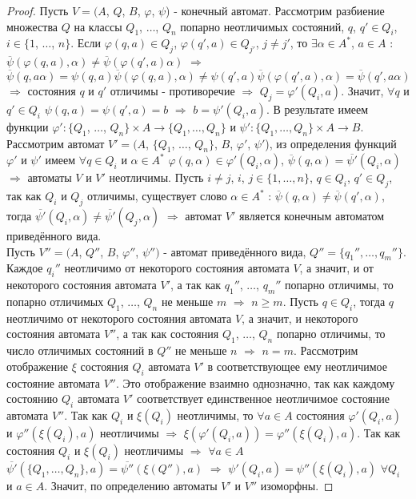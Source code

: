 \documentclass[a4paper, 12pt]{article}
\renewcommand{\phi}{\varphi}
\theoremstyle{definition}
\theoremstyle{plain}
\theoremstyle{remark}
\begin{document}
  \begin{proof}
    Пусть $V=(A$, $Q$, $B$, $\phi$, $\psi$) - конечный автомат. Рассмотрим разбиение множества $Q$ на классы $Q_1$, $\ldots$, $Q_n$ попарно неотличимых состояний, $q$, $q'\in Q_i$, $i\in\{1$, $\ldots$, $n\}$. Если $\phi(q,a)\in Q_j$, $\phi(q',a)\in Q_{j'}$, $j\neq j'$, то $\exists \alpha\in A^*$, $a\in A$ : $\overline{\psi}(\phi(q,a),\alpha)\neq\overline{\psi}(\phi(q',a)\alpha)$ $\Longrightarrow$ $\overline{\psi}(q,a\alpha)=\psi(q,a)\overline{\psi}(\phi(q,a),\alpha)\neq\psi(q',a)\overline{\psi}(\phi(q',a),\alpha)=\overline{\psi}(q',a\alpha)$ $\Longrightarrow$ состояния $q$ и $q'$ отличимы - противоречие $\Longrightarrow$ $Q_{j}=\phi'(Q_i,a)$. Значит, $\forall q$ и $q'\in Q_i$ $\psi(q,a)=\psi(q',a)=b$ $\Longrightarrow$ $b=\psi'(Q_i,a)$. В результате имеем функции $\phi':\{Q_1$, $\ldots$, $Q_n\}\times A\rightarrow \{Q_1,\ldots, Q_n\}$ и $\psi':\{Q_1,\ldots, Q_n\}\times A\rightarrow B$. Рассмотрим автомат $V'=(A$, $\{Q_1$, $\ldots$, $Q_n\}$, $B$, $\phi'$, $\psi'$), из определения функций $\phi'$ и $\psi'$ имеем $\forall q\in Q_i$ и $\alpha\in A^*$ $\phi(q,\alpha)\in \phi'(Q_i, \alpha)$, $\overline{\psi}(q,\alpha)=\overline{\psi'}(Q_i,\alpha)$ $\Longrightarrow$ автоматы $V$ и $V'$ неотличимы. Пусть $i\neq j$, $i$, $j\in\{1,\ldots, n\}$, $q\in Q_i$, $q'\in Q_j$, так как $Q_i$ и $Q_j$ отличимы, существует слово $\alpha\in A^*$ : $\overline{\psi}(q,\alpha)\neq\overline{\psi}(q',\alpha)$, тогда $\overline{\psi'}(Q_i, \alpha)\neq\overline{\psi'}(Q_j,\alpha)$ $\Longrightarrow$ автомат $V'$ является конечным автоматом приведённого вида.\\
    Пусть $V''=(A$, $Q''$, $B$, $\phi''$, $\psi'')$ - автомат приведённого вида, $Q''=\{q_1'',\ldots, q_m''\}$. Каждое $q_i''$ неотличимо от некоторого состояния автомата $V$, а значит, и от некоторого состояния автомата $V'$, а так как $q_1''$, $\ldots$, $q_m''$ попарно отличимы, то попарно отличимых $Q_1$, $\ldots$, $Q_n$ не меньше $m$ $\Longrightarrow$ $n\geqslant m$. Пусть $q\in Q_i$, тогда $q$ неотличимо от некоторого состояния автомата $V$, а значит, и некоторого состояния автомата $V''$, а так как состояния $Q_1$, $\ldots$, $Q_n$ попарно отличимы, то число отличимых состояний в $Q''$ не меньше $n$ $\Longrightarrow$ $n=m$. Рассмотрим отображение $\xi$ состояния $Q_i$ автомата $V'$ в соответствующее ему неотличимое состояние автомата $V''$. Это отображение взаимно однозначно, так как каждому состоянию $Q_i$ автомата $V'$ соответствует единственное неотличимое состояние автомата $V''$. Так как $Q_i$ и $\xi(Q_i)$ неотличимы, то $\forall a\in A$ состояния $\phi'(Q_i,a)$ и $\phi''(\xi(Q_i),a)$ неотличимы $\Longrightarrow$ $\xi(\phi'(Q_i,a))=\phi''(\xi(Q_i),a)$. Так как состояния $Q_i$ и $\xi(Q_i)$ неотличимы $\Longrightarrow$ $\forall a\in A$ $\overline{\psi'}(\{Q_1,\ldots,Q_n\},a)=\overline{\psi''}(\xi(Q''),a)$ $\Longrightarrow$ $\psi'(Q_i,a)=\psi''(\xi(Q_i),a)$ $\forall Q_i$ и $a\in A$. Значит, по определению автоматы $V'$ и $V''$ изоморфны.
  \end{proof}
\end{document}
